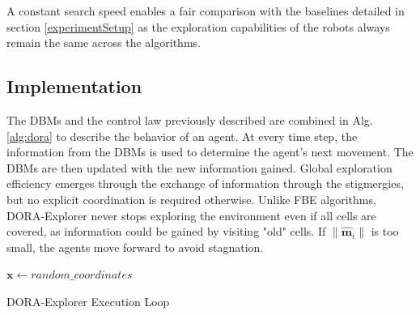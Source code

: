 \documentclass[letterpaper, 10 pt, conference]{ieeeconf}
\begin{document}
A constant search speed enables a fair comparison with the baselines detailed in section \ref{experimentSetup} as the exploration capabilities of the robots always remain the same across the algorithms.

\subsection{Implementation}
The DBMs and the control law previously described are combined in
Alg. \ref{alg:dora} to describe the behavior of an agent. At every
time step, the information from the DBMs is used to determine the
agent's next movement. The DBMs are then updated with the new
information gained. Global exploration efficiency emerges through the
exchange of information through the stigmergies, but no explicit
coordination is required otherwise. Unlike FBE algorithms, DORA-Explorer never
stops exploring the environment even if all cells are covered, as
information could be gained by visiting "old" cells. If
$\|\bm{\hat{m}}_i\|$ is too small, the agents move forward to avoid
stagnation.

\begin{algorithm}[h]
\small
\SetAlgoLined
\DontPrintSemicolon
 $\bm{x} \leftarrow random\_coordinates$\;
 \caption{DORA-Explorer Execution Loop}
 \label{alg:dora}
\end{algorithm}


\end{document}
